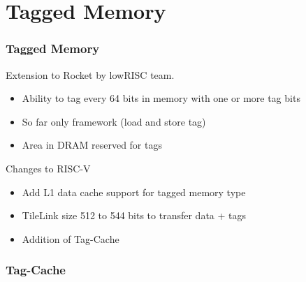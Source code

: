 \documentclass{beamer}
\begin{document}
\section{Tagged Memory}
\begin{frame}
	\frametitle{Tagged Memory}
	Extension to Rocket by lowRISC team.
	\begin{itemize}
		\item Ability to tag every 64 bits in memory with one or more tag bits
		\item So far only framework (load and store tag)
		\item Area in DRAM reserved for tags
	\end{itemize}
	Changes to RISC-V
		\begin{itemize}
		\item Add L1 data cache support for tagged memory type
		\item TileLink size 512 to 544 bits to transfer data + tags
		\item Addition of Tag-Cache
	\end{itemize}
\end{frame}

\begin{frame}
	\frametitle{Tag-Cache}
\begin{figure}[!h]
	\begin{center}
	\end{center}
	\end{figure}
\end{frame}
\end{document}
